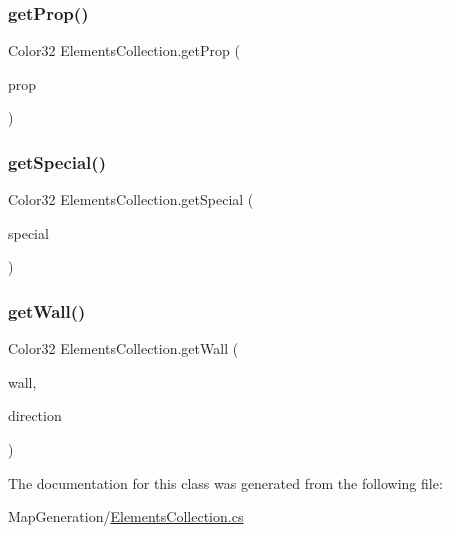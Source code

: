 \mbox{\label{class_elements_collection_accdb5e65ee93f2c0bad3409f17590e05}} 
\subsubsection{\texorpdfstring{get\+Prop()}{getProp()}}
{\footnotesize\ttfamily Color32 Elements\+Collection.\+get\+Prop (\begin{DoxyParamCaption}\item[{\mbox{\hyperlink{class_elements_collection_ac2ee575d2d4b1175b1b36ff3a9080e18}{Props}}}]{prop }\end{DoxyParamCaption})}

\mbox{\label{class_elements_collection_aabdf48ae1c87c9c9aeef455d0df387ef}} 
\subsubsection{\texorpdfstring{get\+Special()}{getSpecial()}}
{\footnotesize\ttfamily Color32 Elements\+Collection.\+get\+Special (\begin{DoxyParamCaption}\item[{\mbox{\hyperlink{class_elements_collection_af92a57db43ac98e7d4ac2b5bafe69284}{Special}}}]{special }\end{DoxyParamCaption})}

\mbox{\label{class_elements_collection_a375dc91e04eefe3bbcbd1d7c5126e538}} 
\subsubsection{\texorpdfstring{get\+Wall()}{getWall()}}
{\footnotesize\ttfamily Color32 Elements\+Collection.\+get\+Wall (\begin{DoxyParamCaption}\item[{\mbox{\hyperlink{class_elements_collection_ab13b688210e7e8a238d0fcda6c22ee59}{Walls}}}]{wall,  }\item[{\mbox{\hyperlink{_directions_enum_8cs_a6bd1f747985f3fcfa3faca85ff3fd8e8}{Directions\+Enum}}}]{direction }\end{DoxyParamCaption})}



The documentation for this class was generated from the following file\+:\begin{DoxyCompactItemize}
\item 
Map\+Generation/\mbox{\hyperlink{_elements_collection_8cs}{Elements\+Collection.\+cs}}\end{DoxyCompactItemize}
